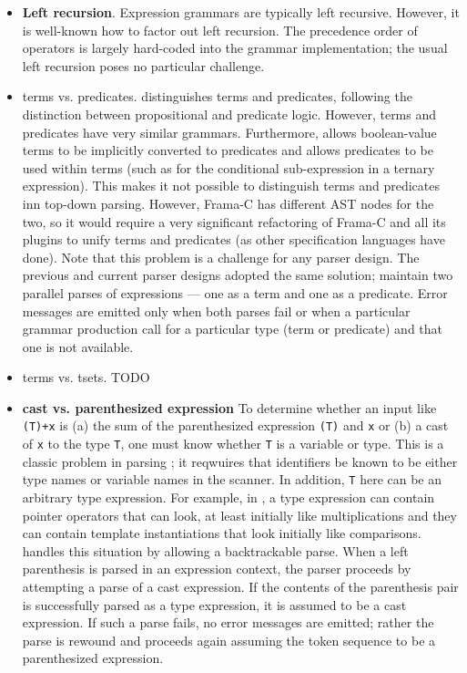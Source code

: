 \begin{itemize}
\item \textbf{Left recursion}. Expression grammars are typically left recursive. However, it is well-known how to factor out left recursion. The precedence order of operators is largely hard-coded into the grammar implementation; the usual left recursion poses no particular challenge.
\item {terms vs. predicates}. \acslpp distinguishes terms and predicates, following the distinction between propositional and predicate logic. However, terms and predicates have very similar grammars. Furthermore, \acslpp allows boolean-value terms to be implicitly converted to predicates and allows predicates to be used within terms (such as for the conditional sub-expression in a ternary expression). This makes it not possible to distinguish terms and predicates inn top-down parsing. However, Frama-C has different AST nodes for the two, so it would require a very significant refactoring of Frama-C and all its plugins to unify terms and predicates (as other specification languages have done). Note that this problem is a challenge for any parser design. The previous and current parser designs adopted the same solution; maintain two parallel parses of expressions --- one as a term and one as a predicate. Error messages are emitted only when both parses fail or when a particular grammar production call for a particular type (term or predicate) and that one is not available.
\item{terms vs. tsets}. TODO
\item \textbf{cast vs. parenthesized expression} To determine whether an input like \lstinline|(T)+x| is (a) the sum of the parenthesized expression \lstinline|(T)| and \lstinline|x| or (b) a cast of \lstinline|x| to the type \lstinline|T|, one must know whether \lstinline|T| is a variable or type. This is a classic problem in parsing \lang; it reqwuires that identifiers be known to be either type names or variable names in the scanner. In addition, \lstinline|T| here can be an arbitrary type expression. For example, in \lang, a type expression can contain pointer operators that can look, at least initially like multiplications and they can contain template instantiations that look initially like comparisons. \fclang handles this situation by allowing a backtrackable parse. When a left parenthesis is parsed in an expression context, the parser proceeds by attempting a parse of a cast expression. If the contents of the parenthesis pair is successfully parsed as a type expression, it is assumed to be a cast expression. If such a parse fails, no error messages are emitted; rather the parse is rewound and proceeds again assuming the token sequence to be a parenthesized expression.

\end{itemize}
